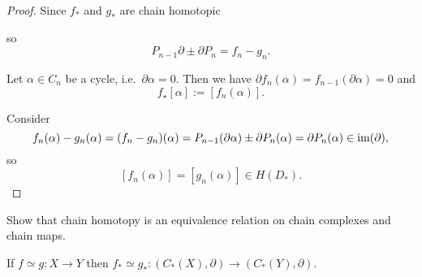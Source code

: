\documentclass[a4paper,11pt]{article}
\begin{document}
	\begin{proof}
		Since $f_*$ and $g_*$ are chain homotopic
		\begin{center}
		\end{center}
		so
		\[
			P _{n-1} \partial \pm \partial P_n = f_n - g_n.
		\]
		
		Let $\alpha \in C_n$ be a cycle, i.e.\ $\partial \alpha = 0$. Then we have $\partial f_n(\alpha) = f _{n-1}(\partial \alpha) = 0$ and
		\[
			f_\star [\alpha] := [f_n (\alpha)].
		\]

		Consider
		\[
			f_n (\alpha) - g_n (\alpha) = (f_n - g_n) (\alpha) = P _{n-1} (\partial \alpha) \pm \partial P_n (\alpha) = \partial P_n (\alpha) \in \operatorname{im}(\partial),
		\]
		so
		\[
			[f_n(\alpha)] = [g_n(\alpha)] \in H(D_*).
		\]
	\end{proof}

	\begin{exer}
		Show that chain homotopy is an equivalence relation on chain complexes and chain maps.
	\end{exer}
	
	\begin{thm}
		If $f \simeq g : X \to Y$ then $f_* \simeq g_* : (C_*(X),\partial) \to (C_*(Y),\partial)$. 
	\end{thm}
	
\end{document}

